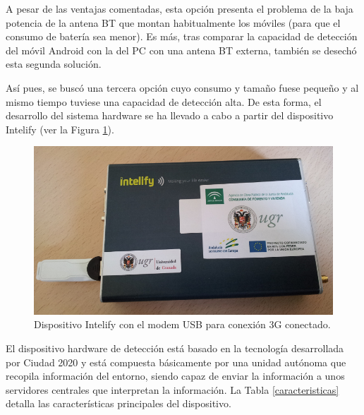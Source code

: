 \documentclass[twocolumn,twoside]{Jornadas}
\begin{document}
A pesar de las ventajas comentadas, esta opción presenta el problema de la baja potencia de la antena BT que montan habitualmente los móviles (para que el consumo de batería sea menor). Es más, tras comparar la capacidad de detección del móvil Android con la del PC con una antena BT externa, también se desechó esta segunda solución.


Así pues, se buscó una tercera opción cuyo consumo y tamaño fuese pequeño y al mismo tiempo tuviese una capacidad de detección alta. 
De esta forma, el desarrollo del sistema hardware se ha llevado a cabo a partir del dispositivo Intelify \cite{intelify} (ver la Figura \ref{intelify}).

\begin{figure}[htpb] 
\begin{center} 
\includegraphics[scale=0.25]{intelifychisme1.png}
\end{center} 
\caption{Dispositivo Intelify con el modem USB para conexión 3G conectado.} 
\label{intelify} 
\end{figure}


El dispositivo hardware de detección está basado en la tecnología
desarrollada por Ciudad 2020 \cite{cityanalytics,Blobject} y está
compuesta básicamente por una unidad autónoma que recopila información
del entorno, siendo capaz de enviar la información a unos servidores
centrales que interpretan la información.  %
La Tabla \ref{caracteristicas} detalla las características principales del dispositivo.
\end{document}
